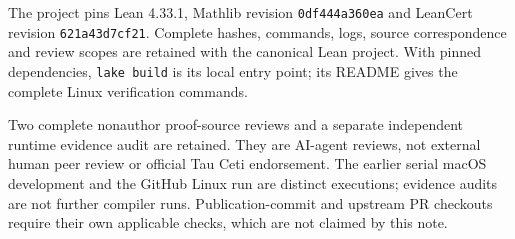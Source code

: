\documentclass[11pt,a4paper]{article}
\begin{document}
The project pins Lean 4.33.1, Mathlib revision
\texttt{0df444a360ea} and LeanCert revision \texttt{621a43d7cf21}.
Complete hashes, commands, logs, source correspondence and review scopes
are retained with the canonical Lean project. With pinned dependencies,
\texttt{lake build} is its local entry point; its README gives the complete
Linux verification commands.

Two complete nonauthor proof-source reviews and a separate independent
runtime evidence audit are retained. They are AI-agent reviews, not external
human peer review or official Tau Ceti endorsement. The earlier serial macOS
development and the GitHub Linux run are distinct executions; evidence audits
are not further compiler runs. Publication-commit and upstream PR checkouts
require their own applicable checks, which are not claimed by this note.
\end{document}
